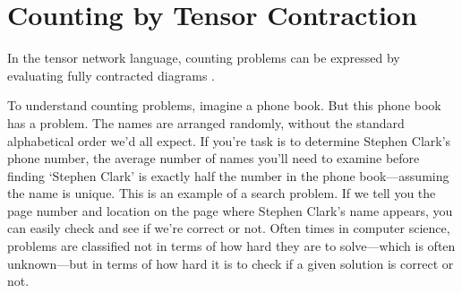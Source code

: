 \documentclass[aps,pra,12pt,nofootinbib,superscriptaddress,longbibliography]{revtex4-1}
\theoremstyle{plain}
\theoremstyle{definition}
\newtheorem{example}[theorem]{Example}
\DeclareMathOperator{\Tr}{Tr}
\newcommand{\I}{\openone}     %
\newcommand{\be}{\begin{equation}}
\newcommand{\ee}{\end{equation}}
\begin{document}
% 
% 
% 




\section[Counting]{Counting by Tensor Contraction} 

In the tensor network language, counting problems can be expressed by evaluating fully contracted diagrams \cite{Penrose,collected,VTN,BMT15}. 

To understand counting problems, imagine a phone book.  But this phone book has a problem.  The names are arranged randomly, without the standard alphabetical order we'd all expect.  If you're task is to determine Stephen Clark's phone number, the average number of names you'll need to examine before finding `Stephen Clark' is exactly half the number in the phone book---assuming the name is unique.  This is an example of a search problem.  If we tell you the page number and location on the page where Stephen Clark's name appears, you can easily check and see if we're correct or not.  Often times in computer science, problems are classified not in terms of how hard they are to solve---which is often unknown---but in terms of how hard it is to check if a given solution is correct or not.  
\end{document}
